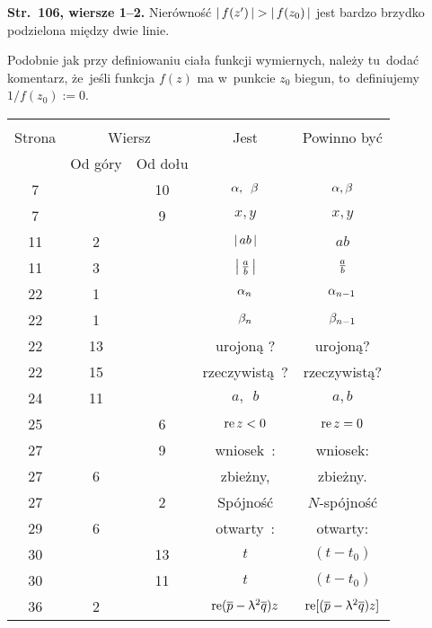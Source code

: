 \documentclass[a4paper,11pt]{article}
\begin{document}
\start \textbf{Str.~106, wiersze 1--2.} Nierówność
$\left| \,  f( z' )  \, \right| > \left| \,  f( z_{ 0 } )  \, \right|$ jest bardzo brzydko
podzielona między dwie linie.

\vspace{\spaceFour}


\start {} Podobnie jak przy definiowaniu ciała funkcji
wymiernych, należy tu~dodać komentarz, że~jeśli funkcja $f( z )$ ma
w~punkcie $z_{ 0 }$ biegun, to~definiujemy $1 / f( z_{ 0 } ) := 0$.

\vspace{\spaceFour}


\begin{center}
  \begin{tabular}{|c|c|c|c|c|}
    \hline
    & \multicolumn{2}{c|}{} & & \\
    Strona & \multicolumn{2}{c|}{Wiersz} & Jest
                              & Powinno być \\ \cline{2-3}
    & Od góry & Od dołu & & \\
    \hline
    7   & & 10 & $\alpha,\:\; \beta$ & $\alpha, \beta$ \\
    7   & &  9 & $x,\! y$ & $x, y$ \\
    11  &  2 & & $\left| \,  a b  \, \right|$ & $ab$ \\
    11  &  3 & & $\left| \,  \tfrac{ a }{ b }  \, \right|$ & $\tfrac{ a }{ b }$ \\
    22  &  1 & & $\alpha_{ n }$ & $\alpha_{ n - 1 }$ \\
    22  &  1 & & $\beta_{ n }$ & $\beta_{ n - 1 }$ \\
    22  & 13 & & urojoną ? & urojoną? \\
    22  & 15 & & rzeczywistą~? & rzeczywistą? \\
    24  & 11 & & $a, \:\; b$ & $a, b$ \\
    25  & &  6 & $\textrm{re}\, z < 0$ & $\textrm{re}\, z = 0$ \\
    27  & &  9 & wniosek~: & wniosek: \\
    27  &  6 & & zbieżny, & zbieżny. \\
    27  & &  2 & Spójność & $N$-spójność \\
    29  &  6 & & otwarty~: & otwarty: \\
    30  & & 13 & $t$ & $( t - t_{ 0 } )$ \\
    30  & & 11 & $t$ & $( t - t_{ 0 } )$ \\
    36  &  2 & & $\textrm{re}( \overline{ p } - \uplambda^{ 2 } \overline{ q } ) z$
           & $\textrm{re}[( \overline{ p } - \uplambda^{ 2 } \overline{ q } ) z]$ \\

\end{tabular}
\end{center}
\end{document}
